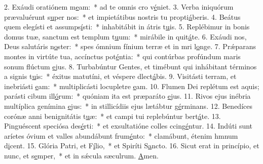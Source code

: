 2. Exáudi oratiónem m\uline{e}am:~* ad te omnis cro v\uline{é}niet.
3. Verba iniquórum prævaluérunt s\uline{u}per nos:~* et impietátibus nostris tu propti\uline{á}beris.
4. Beátus quem elegísti et assumps\uline{í}sti:~* inhabitábit in átris t\uline{u}is.
5. Replébimur in bonis domus tuæ, sanctum est templum t\uline{u}um:~* mirábile in quit\uline{á}te.
6. Exáudi nos, Deus salutáris n\uline{o}ster:~* spes ómnium fínium terræ et in mri l\uline{o}nge.
7. Prǽparans montes in virtúte tua, accínctus pot\uline{é}ntia:~* qui contúrbas profúndum maris sonum flúctum \uline{e}jus.
8. Turbabúntur Gentes, et timébunt qui inhábitant términos a signis t\uline{u}is:~* éxitus matutíni, et véspere dlect\uline{á}bis.
9. Visitásti terram, et inebriásti \uline{e}am:~* multiplicásti locupletre \uline{e}am.
10. Flumen Dei replétum est aquis; parásti cibum ill\uline{ó}rum:~* quóniam ita est præparáto \uline{e}jus.
11. Rivos ejus inébria multíplica genímina \uline{e}jus:~* in stillicídiis ejus lætábtur g\uline{é}rminans.
12. Benedíces corónæ anni benignitátis t\uline{u}æ:~* et campi tui replebúntur bert\uline{á}te.
13. Pinguéscent speciósa des\uline{é}rti:~* et exsultatióne colles ccing\uline{é}ntur.
14. Indúti sunt aríetes óvium et valles abundábunt frum\uline{é}nto:~* clamábunt, étenim hmnum d\uline{i}cent.
15. Glória Patri, et F\uline{í}lio,~* et Spiríti S\uline{a}ncto.
16. Sicut erat in princípio, et nunc, et s\uline{e}mper,~* et in sǽcula sæculrum. \uline{A}men.
